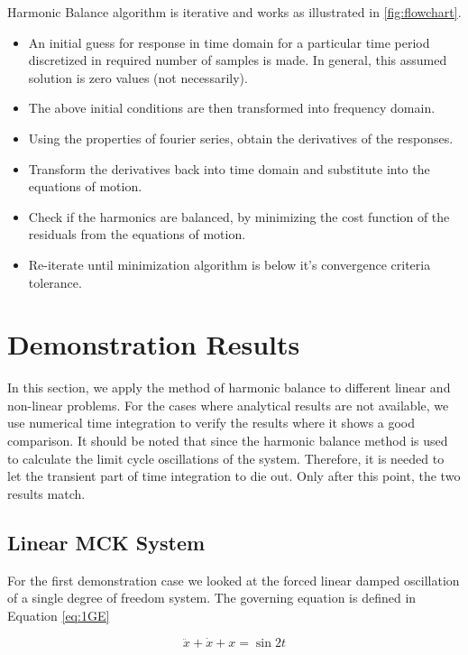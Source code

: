 \documentclass[12pt, a4paper]{extarticle}
\begin{document}
Harmonic Balance algorithm is iterative and works as illustrated in \ref{fig:flowchart}.
\begin{itemize}
\item An initial guess for response in time domain for a particular time period discretized in required number of samples is made. In general, this assumed solution is zero values (not necessarily).
\item The above initial conditions are then transformed into frequency domain. 
\item Using the properties of fourier series, obtain the derivatives of the responses.
\item Transform the derivatives back into time domain and substitute into the equations of motion.
\item Check if the harmonics are balanced, by minimizing the cost function of the residuals from the equations of motion. 
\item Re-iterate until minimization algorithm is below it's convergence criteria tolerance.
\end{itemize}

\section{Demonstration Results}
In this section, we apply the method of harmonic balance to different linear and non-linear problems. For the cases where analytical results are not available, we use numerical time integration to verify the results where it shows a good comparison. It should be noted that since the harmonic balance method is used to calculate the limit cycle oscillations of the system. Therefore, it is needed to let the transient part of time integration to die out. Only after this point, the two results match.

\subsection{Linear MCK System}
For the first demonstration case we looked at the forced linear damped oscillation of a single degree of freedom system. The governing equation is defined in Equation \eqref{eq:1GE}

\begin{equation}\label{eq:1GE}
	\ddot{x} + \dot{x} + x = \sin 2t
\end{equation}
\end{document}
